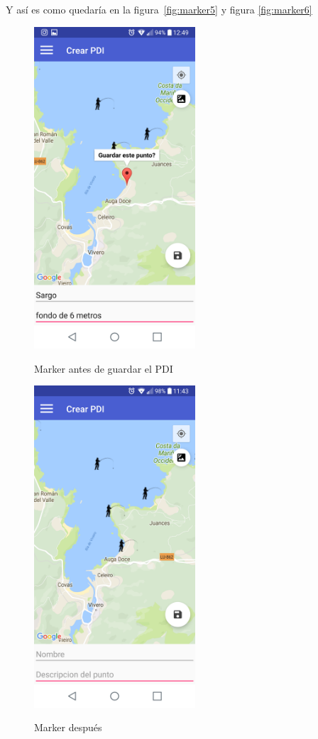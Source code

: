  
 
 Y así es como quedaría en la figura~\ref{fig:marker5} y figura \ref{fig:marker6}

 
 
 
	\begin{figure}
\begin{minipage}[b]{0.5\linewidth} %
\centering
\includegraphics[width=6cm]{capturamovil/pdiguardar.png}
 \label{marker5}
\caption{Marker antes de guardar el PDI}

\end{minipage}
\hspace{0.5cm} %
\begin{minipage}[b]{0.5\linewidth}
\centering
\includegraphics[width=6cm]{capturamovil/pdiguardar2.png}
 \label{marker6}
\caption{Marker después }

\end{minipage}
		\label{fig:marker}

\end{figure} 
 
